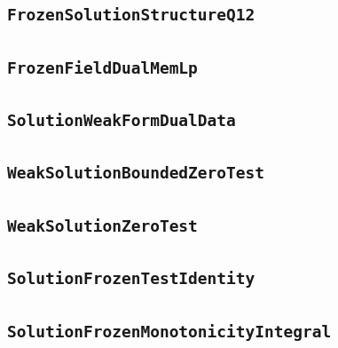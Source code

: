 \documentclass[11pt]{amsart}
\theoremstyle{definition}
\begin{document}
\subsection{\texorpdfstring{\texttt{FrozenSolutionStructureQ12}}{FrozenSolutionStructureQ12}}\label{node:FrozenSolutionStructureQ12}


\subsection{\texorpdfstring{\texttt{FrozenFieldDualMemLp}}{FrozenFieldDualMemLp}}\label{node:FrozenFieldDualMemLp}


\subsection{\texorpdfstring{\texttt{SolutionWeakFormDualData}}{SolutionWeakFormDualData}}\label{node:SolutionWeakFormDualData}


\subsection{\texorpdfstring{\texttt{WeakSolutionBoundedZeroTest}}{WeakSolutionBoundedZeroTest}}\label{node:WeakSolutionBoundedZeroTest}


\subsection{\texorpdfstring{\texttt{WeakSolutionZeroTest}}{WeakSolutionZeroTest}}\label{node:WeakSolutionZeroTest}


\subsection{\texorpdfstring{\texttt{SolutionFrozenTestIdentity}}{SolutionFrozenTestIdentity}}\label{node:SolutionFrozenTestIdentity}


\subsection{\texorpdfstring{\texttt{SolutionFrozenMonotonicityIntegral}}{SolutionFrozenMonotonicityIntegral}}\label{node:SolutionFrozenMonotonicityIntegral}

\end{document}

